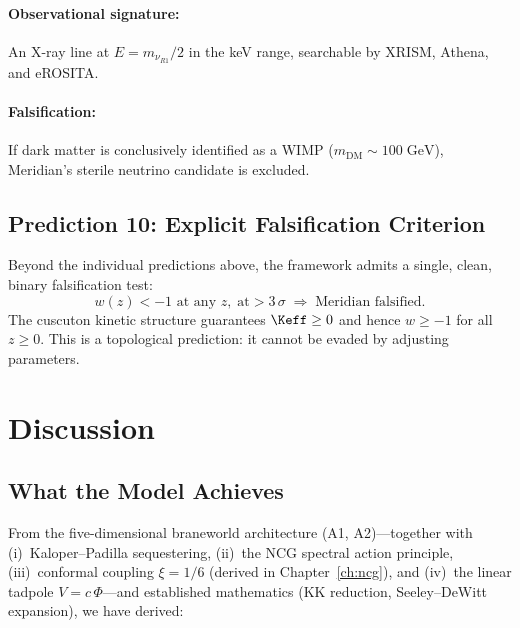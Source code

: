 \paragraph{Observational signature:} An X-ray line at $E = m_{\nu_{R1}}/2$ in the keV range, searchable by XRISM, Athena, and eROSITA.

\paragraph{Falsification:} If dark matter is conclusively identified as a WIMP ($m_\mathrm{DM} \sim 100\;\mathrm{GeV}$), Meridian's sterile neutrino candidate is excluded.

\subsection{Prediction 10: Explicit Falsification Criterion}
\label{sec:1-pred10}

Beyond the individual predictions above, the framework admits a single, clean, binary falsification test:
\begin{equation}
\label{eq:1-phantom-falsification}
\boxed{w(z) < -1 \text{ at any }z,\;\text{at} > 3\,\sigma \;\Rightarrow\; \text{Meridian falsified.}}
\end{equation}
The cuscuton kinetic structure guarantees $\Keff \geq 0$ and hence $w \geq -1$ for all $z \geq 0$. This is a topological prediction: it cannot be evaded by adjusting parameters.


\section{Discussion}
\label{sec:1-discussion}

\subsection{What the Model Achieves}
\label{sec:1-achievements}

From the five-dimensional braneworld architecture (A1, A2)---together with (i)~Kaloper--Padilla sequestering, (ii)~the NCG spectral action principle, (iii)~conformal coupling $\xi = 1/6$ (derived in Chapter~\ref{ch:ncg}), and (iv)~the linear tadpole $V = c\,\Phi$---and established mathematics (KK reduction, Seeley--DeWitt expansion), we have derived:

